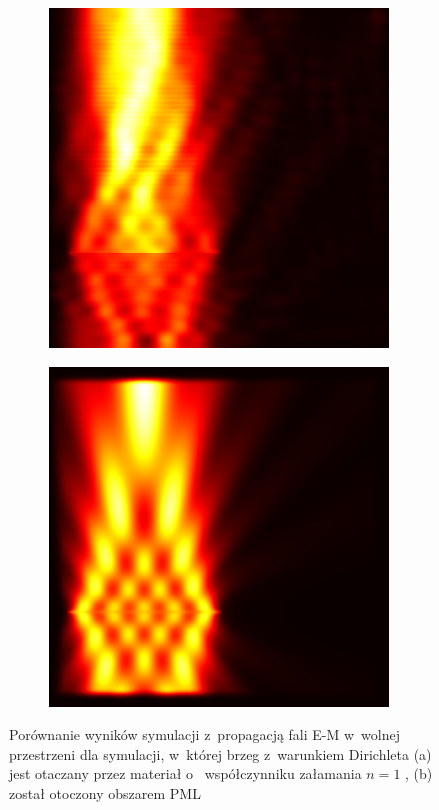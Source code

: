 \begin{figure}[tb]
	\centering
	\begin{subfigure}{0.45\textwidth}
		\includegraphics[width=\textwidth]{images/wstep/SUM-nopml-energy.png}
		\caption{}
		\label{fig:wstep-pml-bad}
	\end{subfigure}
	\begin{subfigure}{0.45\textwidth}
		\includegraphics[width=\textwidth]{images/wstep/SUM-pml-energy.png}
		\caption{}
	\end{subfigure}
	\caption{Porównanie wyników symulacji z~propagacją fali E-M w~wolnej przestrzeni dla symulacji, w~której brzeg z~warunkiem Dirichleta (a) jest otaczany przez materiał o~ współczynniku załamania $n=1$ , (b) został otoczony obszarem PML}
\end{figure}

